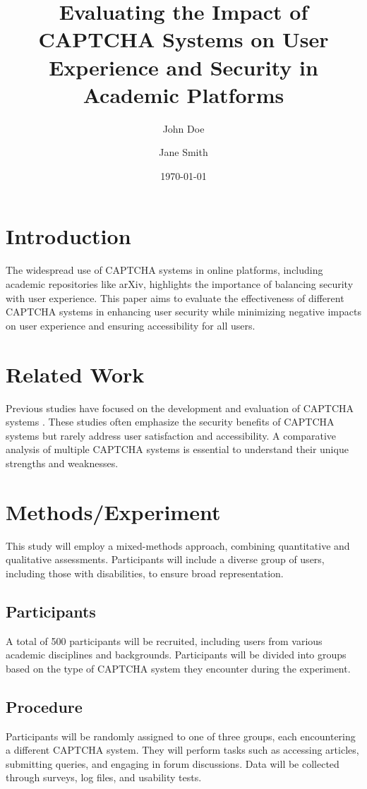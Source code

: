 \documentclass{article}
\title{Evaluating the Impact of CAPTCHA Systems on User Experience and Security in Academic Platforms}
\author{John Doe \and Jane Smith}
\date{\today}
\begin{document}
\maketitle

\section{Introduction}
The widespread use of CAPTCHA systems in online platforms, including academic repositories like arXiv, highlights the importance of balancing security with user experience. This paper aims to evaluate the effectiveness of different CAPTCHA systems in enhancing user security while minimizing negative impacts on user experience and ensuring accessibility for all users.

\section{Related Work}
Previous studies have focused on the development and evaluation of CAPTCHA systems \cite{captcha_review}. These studies often emphasize the security benefits of CAPTCHA systems but rarely address user satisfaction and accessibility. A comparative analysis of multiple CAPTCHA systems is essential to understand their unique strengths and weaknesses.

\section{Methods/Experiment}
This study will employ a mixed-methods approach, combining quantitative and qualitative assessments. Participants will include a diverse group of users, including those with disabilities, to ensure broad representation.

\subsection{Participants}
A total of 500 participants will be recruited, including users from various academic disciplines and backgrounds. Participants will be divided into groups based on the type of CAPTCHA system they encounter during the experiment.

\subsection{Procedure}
Participants will be randomly assigned to one of three groups, each encountering a different CAPTCHA system. They will perform tasks such as accessing articles, submitting queries, and engaging in forum discussions. Data will be collected through surveys, log files, and usability tests.
\end{document}
